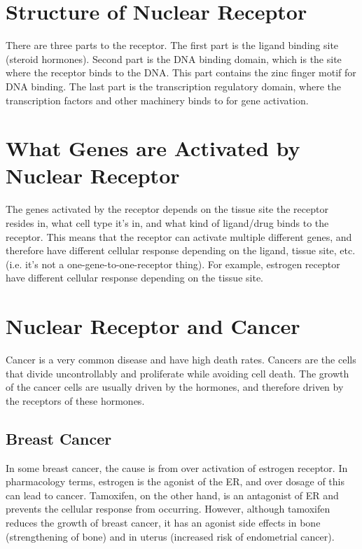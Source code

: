 \section{Structure of Nuclear Receptor}

\begin{center}
\end{center}

There are three parts to the receptor.
The first part is the ligand binding site (steroid hormones).
Second part is the DNA binding domain, which is the site where the receptor binds to the DNA.
This part contains the zinc finger motif for DNA binding.
The last part is the transcription regulatory domain, where the transcription factors and other machinery binds to for gene activation.

\section{What Genes are Activated by Nuclear Receptor}

The genes activated by the receptor depends on the tissue site the receptor resides in, what cell type it's in, and what kind of ligand/drug binds to the receptor.
This means that the receptor can activate multiple different genes, and therefore have different cellular response depending on the ligand, tissue site, etc. (i.e. it's not a one-gene-to-one-receptor thing).
For example, estrogen receptor have different cellular response depending on the tissue site.

\section{Nuclear Receptor and Cancer}

Cancer is a very common disease and have high death rates.
Cancers are the cells that divide uncontrollably and proliferate while avoiding cell death.
The growth of the cancer cells are usually driven by the hormones, and therefore driven by the receptors of these hormones.

\subsection{Breast Cancer}

In some breast cancer, the cause is from over activation of estrogen receptor.
In pharmacology terms, estrogen is the agonist of the ER, and over dosage of this can lead to cancer.
Tamoxifen, on the other hand, is an antagonist of ER and prevents the cellular response from occurring.
However, although tamoxifen reduces the growth of breast cancer, it has an agonist side effects in bone (strengthening of bone) and in uterus (increased risk of endometrial cancer).

